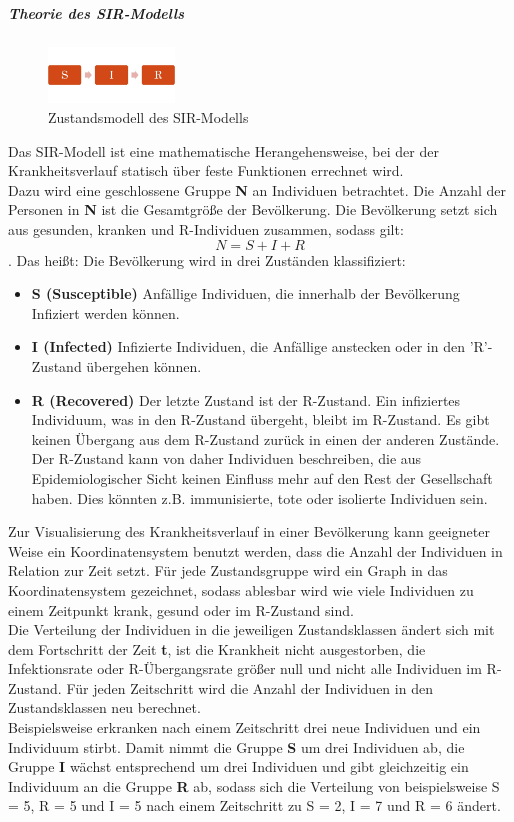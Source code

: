 \subparagraph{Theorie des SIR-Modells}
\begin{figure}
\includegraphics[width= 0.3\textwidth]{./images/SIR-Modell.jpg}\caption{Zustandsmodell des SIR-Modells}
\end{figure}
Das SIR-Modell ist eine mathematische Herangehensweise, bei der der Krankheitsverlauf statisch über feste Funktionen errechnet wird. \\
Dazu wird eine geschlossene Gruppe \textbf{N} an Individuen betrachtet. Die Anzahl der Personen in \textbf{N} ist die Gesamtgröße der Bevölkerung. Die Bevölkerung setzt sich aus gesunden, kranken und \glqq R\grqq-Individuen zusammen, sodass gilt:
\begin{equation}
N = S + I + R
\end{equation}
. Das heißt: Die Bevölkerung wird in drei Zuständen klassifiziert:
\begin{itemize}
\item \textbf{S (Susceptible)} Anfällige Individuen, die innerhalb der Bevölkerung Infiziert werden können.
\item \textbf{I (Infected)} Infizierte Individuen, die Anfällige anstecken  oder in den 'R'-Zustand übergehen können.
\item \textbf{R (Recovered)} Der letzte Zustand ist der \glqq R\grqq-Zustand. Ein infiziertes Individuum, was in den \glqq R\grqq -Zustand übergeht, bleibt im R-Zustand. Es gibt keinen Übergang aus dem R-Zustand zurück in einen der anderen Zustände. Der R-Zustand kann von daher Individuen beschreiben, die aus Epidemiologischer Sicht keinen Einfluss mehr auf den Rest der Gesellschaft haben. Dies könnten z.B. immunisierte, tote oder isolierte Individuen sein.
\end{itemize}
Zur Visualisierung des Krankheitsverlauf in einer Bevölkerung kann geeigneter Weise ein Koordinatensystem benutzt werden, dass die Anzahl der Individuen in Relation zur Zeit setzt.
Für jede Zustandsgruppe wird ein Graph in das Koordinatensystem gezeichnet, sodass ablesbar wird wie viele Individuen zu einem Zeitpunkt krank, gesund oder im \glqq R\grqq-Zustand sind.\\
Die Verteilung der Individuen in die jeweiligen Zustandsklassen ändert sich mit dem Fortschritt der Zeit \textbf{t}, ist die Krankheit nicht ausgestorben, die Infektionsrate oder \glqq R\grqq-Übergangsrate größer null und nicht alle Individuen im \glqq R\grqq-Zustand.
Für jeden Zeitschritt wird die Anzahl der Individuen in den Zustandsklassen neu berechnet.\\
Beispielsweise erkranken nach einem Zeitschritt drei neue Individuen und ein Individuum stirbt. Damit nimmt die Gruppe  \textbf{S} um drei Individuen ab, die Gruppe \textbf{I} wächst entsprechend um drei Individuen und gibt gleichzeitig ein Individuum an die Gruppe \textbf{R} ab, sodass sich die Verteilung von beispielsweise S = 5, R = 5 und I = 5 nach einem Zeitschritt zu S = 2, I = 7 und R = 6 ändert.

